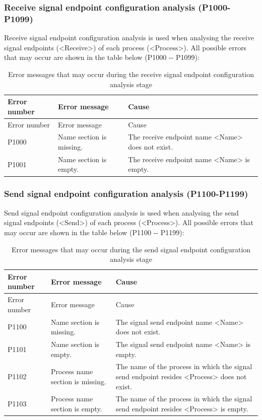 \subsubsection{Receive signal endpoint configuration analysis (P1000-P1099)}\label{subsubsec:5-6-2-11}

Receive signal endpoint configuration analysis is used when analysing the receive signal endpoints (<Receive>) of each process (<Process>). All possible errors that may occur are shown in the table below (P1000
-\/- P1099):

\begin{xltabular}{\textwidth}{@{}>{\hsize\raggedright\arraybackslash}X>{\hsize\raggedright\arraybackslash}X>{\hsize\raggedright\arraybackslash}X@{}}
\caption{Error messages that may occur during the receive signal endpoint configuration analysis stage}\label{tab:5-13}\\
\toprule
Error number & Error message & Cause\tabularnewline
\endfirsthead
\toprule
Error number & Error message & Cause\tabularnewline
\midrule
\endhead
\bottomrule
\endlastfoot
P1000 & Name section is missing. &
The receive endpoint name <Name> does not exist.\tabularnewline
P1001 & Name section is empty. &
The receive endpoint name <Name> is empty.\tabularnewline
\end{xltabular}

\subsubsection{Send signal endpoint configuration analysis (P1100-P1199)}\label{subsubsec:5-6-2-12}

Send signal endpoint configuration analysis is used when analysing the send signal endpoints (<Send>) of each process (<Process>). All possible errors that may occur are shown in the table below (P1100
-\/- P1199):

\begin{xltabular}{\textwidth}{@{}>{\hsize\raggedright\arraybackslash}X>{\hsize\raggedright\arraybackslash}X>{\hsize\raggedright\arraybackslash}X@{}}
\caption{Error messages that may occur during the send signal endpoint configuration analysis stage}\label{tab:5-14}\\
\toprule
Error number & Error message & Cause\tabularnewline
\endfirsthead
\toprule
Error number & Error message & Cause\tabularnewline
\midrule
\endhead
\bottomrule
\endlastfoot
P1100 & Name section is missing. &
The signal send endpoint name <Name> does not exist.\tabularnewline
P1101 & Name section is empty. &
The signal send endpoint name <Name> is empty.\tabularnewline
P1102 & Process name section is missing. &
The name of the process in which the signal send endpoint resides <Process> does not exist.\tabularnewline
P1103 & Process name section is empty. &
The name of the process in which the signal send endpoint resides <Process> is empty.\tabularnewline
\end{xltabular}

